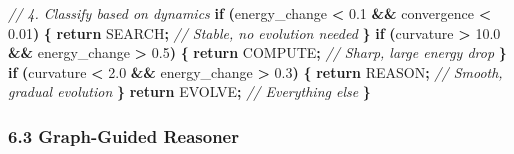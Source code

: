 \documentclass[
  11pt,
  a4paper,
]{article}
\newenvironment{Shaded}{\begin{snugshade}}{\end{snugshade}}
\newcommand{\CommentTok}[1]{\textcolor[rgb]{0.56,0.35,0.01}{\textit{#1}}}
\newcommand{\ControlFlowTok}[1]{\textcolor[rgb]{0.13,0.29,0.53}{\textbf{#1}}}
\newcommand{\FloatTok}[1]{\textcolor[rgb]{0.00,0.00,0.81}{#1}}
\newcommand{\NormalTok}[1]{#1}
\newcommand{\OperatorTok}[1]{\textcolor[rgb]{0.81,0.36,0.00}{\textbf{#1}}}
\begin{document}
\begin{Shaded}
\begin{Highlighting}[]
    \CommentTok{// 4. Classify based on dynamics}
    \ControlFlowTok{if} \OperatorTok{(}\NormalTok{energy\_change }\OperatorTok{\textless{}} \FloatTok{0.1} \OperatorTok{\&\&}\NormalTok{ convergence }\OperatorTok{\textless{}} \FloatTok{0.01}\OperatorTok{)} \OperatorTok{\{}
        \ControlFlowTok{return}\NormalTok{ SEARCH}\OperatorTok{;}  \CommentTok{// Stable, no evolution needed}
    \OperatorTok{\}}
    \ControlFlowTok{if} \OperatorTok{(}\NormalTok{curvature }\OperatorTok{\textgreater{}} \FloatTok{10.0} \OperatorTok{\&\&}\NormalTok{ energy\_change }\OperatorTok{\textgreater{}} \FloatTok{0.5}\OperatorTok{)} \OperatorTok{\{}
        \ControlFlowTok{return}\NormalTok{ COMPUTE}\OperatorTok{;}  \CommentTok{// Sharp, large energy drop}
    \OperatorTok{\}}
    \ControlFlowTok{if} \OperatorTok{(}\NormalTok{curvature }\OperatorTok{\textless{}} \FloatTok{2.0} \OperatorTok{\&\&}\NormalTok{ energy\_change }\OperatorTok{\textgreater{}} \FloatTok{0.3}\OperatorTok{)} \OperatorTok{\{}
        \ControlFlowTok{return}\NormalTok{ REASON}\OperatorTok{;}   \CommentTok{// Smooth, gradual evolution}
    \OperatorTok{\}}
    \ControlFlowTok{return}\NormalTok{ EVOLVE}\OperatorTok{;}       \CommentTok{// Everything else}
\OperatorTok{\}}
\end{Highlighting}
\end{Shaded}

\subsubsection{6.3 Graph-Guided Reasoner}\label{graph-guided-reasoner}
\end{document}
